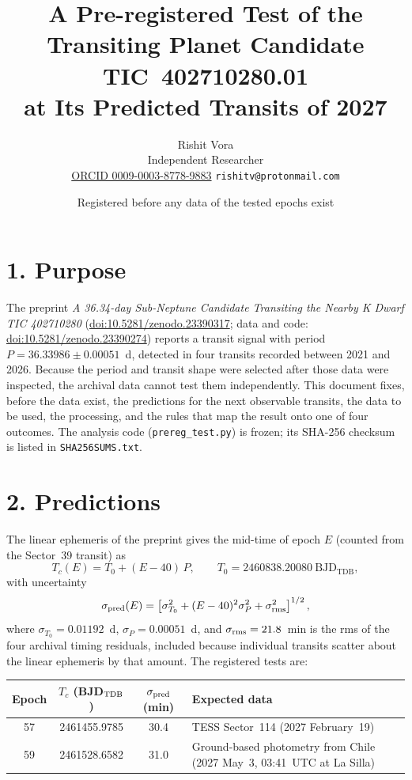 \documentclass[11pt]{article}
\title{A Pre-registered Test of the Transiting Planet Candidate TIC~402710280.01\\ at Its Predicted Transits of 2027}
\author{Rishit Vora\\ \small Independent Researcher \\ \small \href{https://orcid.org/0009-0003-8778-9883}{ORCID 0009-0003-8778-9883} \quad \texttt{rishitv@protonmail.com}}
\date{Registered before any data of the tested epochs exist}
\begin{document}
\maketitle

\section*{1. Purpose}
The preprint \emph{A 36.34-day Sub-Neptune Candidate Transiting the Nearby K Dwarf TIC 402710280} (\href{https://doi.org/10.5281/zenodo.23390317}{doi:10.5281/zenodo.23390317}; data and code: \href{https://doi.org/10.5281/zenodo.23390274}{doi:10.5281/zenodo.23390274}) reports a transit signal with period $P = 36.33986 \pm 0.00051$~d, detected in four transits recorded between 2021 and 2026. Because the period and transit shape were selected after those data were inspected, the archival data cannot test them independently. This document fixes, before the data exist, the predictions for the next observable transits, the data to be used, the processing, and the rules that map the result onto one of four outcomes. The analysis code (\texttt{prereg\_test.py}) is frozen; its SHA-256 checksum is listed in \texttt{SHA256SUMS.txt}.

\section*{2. Predictions}
The linear ephemeris of the preprint gives the mid-time of epoch $E$ (counted from the Sector~39 transit) as
\begin{equation*}
T_c(E) = T_0 + (E - 40)\,P, \qquad T_0 = 2460838.20080~\mathrm{BJD_{TDB}},
\end{equation*}
with uncertainty
\begin{equation*}
\sigma_{\rm pred}(E) = \left[\sigma_{T_0}^2 + (E-40)^2\sigma_P^2 + \sigma_{\rm rms}^2\right]^{1/2},
\end{equation*}
where $\sigma_{T_0} = 0.01192$~d, $\sigma_P = 0.00051$~d, and $\sigma_{\rm rms} = 21.8$~min is the rms of the four archival timing residuals, included because individual transits scatter about the linear ephemeris by that amount. The registered tests are:

\begin{center}
\begin{tabular}{cccl}
\toprule
Epoch & $T_c$ (BJD$_{\rm TDB}$) & $\sigma_{\rm pred}$ (min) & Expected data \\
\midrule
57 & 2461455.9785 & 30.4 & TESS Sector~114 (2027 February~19) \\
59 & 2461528.6582 & 31.0 & Ground-based photometry from Chile (2027 May~3, 03:41~UTC at La Silla) \\
\bottomrule
\end{tabular}
\end{center}
\end{document}
